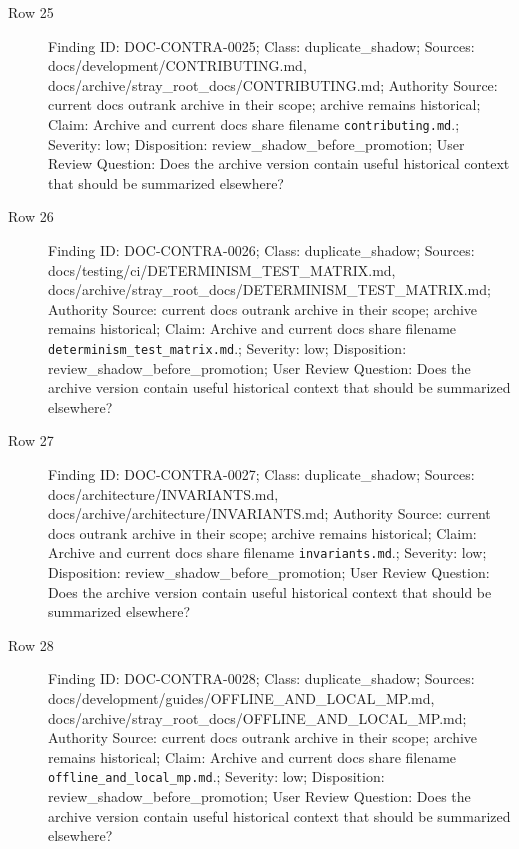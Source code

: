 \documentclass[10.5pt,a4paper,openany]{book}
\begin{document}
\begin{description}
\item[Row 25] Finding ID: DOC-\allowbreak{}CONTRA-\allowbreak{}0025; Class: duplicate\_\allowbreak{}shadow; Sources: docs/\allowbreak{}development/\allowbreak{}CONTRIBUTING.\allowbreak{}md, docs/\allowbreak{}archive/\allowbreak{}stray\_\allowbreak{}root\_\allowbreak{}docs/\allowbreak{}CONTRIBUTING.\allowbreak{}md; Authority Source: current docs outrank archive in their scope; archive remains historical; Claim: Archive and current docs share filename \texttt{contributing.\allowbreak{}md}.\allowbreak{}; Severity: low; Disposition: review\_\allowbreak{}shadow\_\allowbreak{}before\_\allowbreak{}promotion; User Review Question: Does the archive version contain useful historical context that should be summarized elsewhere?
\item[Row 26] Finding ID: DOC-\allowbreak{}CONTRA-\allowbreak{}0026; Class: duplicate\_\allowbreak{}shadow; Sources: docs/\allowbreak{}testing/\allowbreak{}ci/\allowbreak{}DETERMINISM\_\allowbreak{}TEST\_\allowbreak{}MATRIX.\allowbreak{}md, docs/\allowbreak{}archive/\allowbreak{}stray\_\allowbreak{}root\_\allowbreak{}docs/\allowbreak{}DETERMINISM\_\allowbreak{}TEST\_\allowbreak{}MATRIX.\allowbreak{}md; Authority Source: current docs outrank archive in their scope; archive remains historical; Claim: Archive and current docs share filename \texttt{determinism\_\allowbreak{}test\_\allowbreak{}matrix.\allowbreak{}md}.\allowbreak{}; Severity: low; Disposition: review\_\allowbreak{}shadow\_\allowbreak{}before\_\allowbreak{}promotion; User Review Question: Does the archive version contain useful historical context that should be summarized elsewhere?
\item[Row 27] Finding ID: DOC-\allowbreak{}CONTRA-\allowbreak{}0027; Class: duplicate\_\allowbreak{}shadow; Sources: docs/\allowbreak{}architecture/\allowbreak{}INVARIANTS.\allowbreak{}md, docs/\allowbreak{}archive/\allowbreak{}architecture/\allowbreak{}INVARIANTS.\allowbreak{}md; Authority Source: current docs outrank archive in their scope; archive remains historical; Claim: Archive and current docs share filename \texttt{invariants.\allowbreak{}md}.\allowbreak{}; Severity: low; Disposition: review\_\allowbreak{}shadow\_\allowbreak{}before\_\allowbreak{}promotion; User Review Question: Does the archive version contain useful historical context that should be summarized elsewhere?
\item[Row 28] Finding ID: DOC-\allowbreak{}CONTRA-\allowbreak{}0028; Class: duplicate\_\allowbreak{}shadow; Sources: docs/\allowbreak{}development/\allowbreak{}guides/\allowbreak{}OFFLINE\_\allowbreak{}AND\_\allowbreak{}LOCAL\_\allowbreak{}MP.\allowbreak{}md, docs/\allowbreak{}archive/\allowbreak{}stray\_\allowbreak{}root\_\allowbreak{}docs/\allowbreak{}OFFLINE\_\allowbreak{}AND\_\allowbreak{}LOCAL\_\allowbreak{}MP.\allowbreak{}md; Authority Source: current docs outrank archive in their scope; archive remains historical; Claim: Archive and current docs share filename \texttt{offline\_\allowbreak{}and\_\allowbreak{}local\_\allowbreak{}mp.\allowbreak{}md}.\allowbreak{}; Severity: low; Disposition: review\_\allowbreak{}shadow\_\allowbreak{}before\_\allowbreak{}promotion; User Review Question: Does the archive version contain useful historical context that should be summarized elsewhere?

\end{description}
\end{document}

